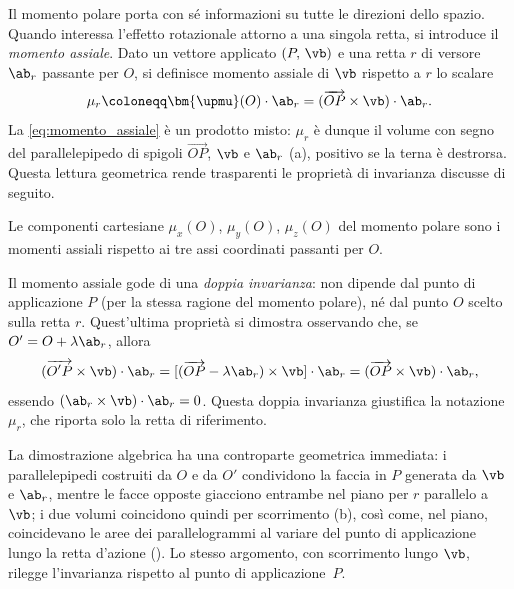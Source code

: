 Il momento polare porta con sé informazioni su tutte le direzioni dello
spazio. Quando interessa l'effetto rotazionale attorno a una singola
retta, si introduce il \textit{momento assiale}. Dato un vettore
applicato $(P,\,\vb)$ e una retta $r$ di versore $\ab_r$ passante per
$O$, si definisce momento assiale di $\vb$ rispetto a $r$ lo scalare
\begin{equation}\label{eq:momento_assiale}
	\mu_r \coloneqq \bm{\upmu}(O) \cdot \ab_r
	= (\overrightarrow{OP} \times \vb) \cdot \ab_r.
\end{equation}
La \eqref{eq:momento_assiale} è un prodotto misto: $\mu_r$ è dunque
il volume con segno del parallelepipedo di spigoli
$\overrightarrow{OP}$, $\vb$ e $\ab_r$
(a), positivo se la terna è destrorsa.
Questa lettura geometrica rende trasparenti le proprietà di
invarianza discusse di seguito.

Le componenti cartesiane $\mu_x(O)$, $\mu_y(O)$, $\mu_z(O)$ del
momento polare sono i momenti assiali rispetto ai tre assi coordinati
passanti per $O$.







Il momento assiale gode di una \textit{doppia invarianza}: non dipende
dal punto di applicazione $P$ (per la stessa ragione del momento
polare), né dal punto $O$ scelto sulla retta $r$. Quest'ultima
proprietà si dimostra osservando che, se $O' = O + \lambda\ab_r$,
allora
\begin{equation}
	(\overrightarrow{O'P} \times \vb) \cdot \ab_r
	= [(\overrightarrow{OP} - \lambda\ab_r) \times \vb] \cdot \ab_r
	= (\overrightarrow{OP} \times \vb) \cdot \ab_r,
\end{equation}
essendo $(\ab_r \times \vb) \cdot \ab_r = 0$. Questa doppia invarianza
giustifica la notazione $\mu_r$, che riporta solo la retta di
riferimento.

La dimostrazione algebrica ha una controparte geometrica immediata:
i parallelepipedi costruiti da $O$ e da $O'$ condividono la faccia
in $P$ generata da $\vb$ e $\ab_r$, mentre le facce opposte giacciono
entrambe nel piano per $r$ parallelo a $\vb$; i due volumi coincidono
quindi per scorrimento (b), così come, nel
piano, coincidevano le aree dei parallelogrammi al variare del punto
di applicazione lungo la retta d'azione
(). Lo stesso argomento, con
scorrimento lungo $\vb$, rilegge l'invarianza rispetto al punto di
applicazione~$P$.


